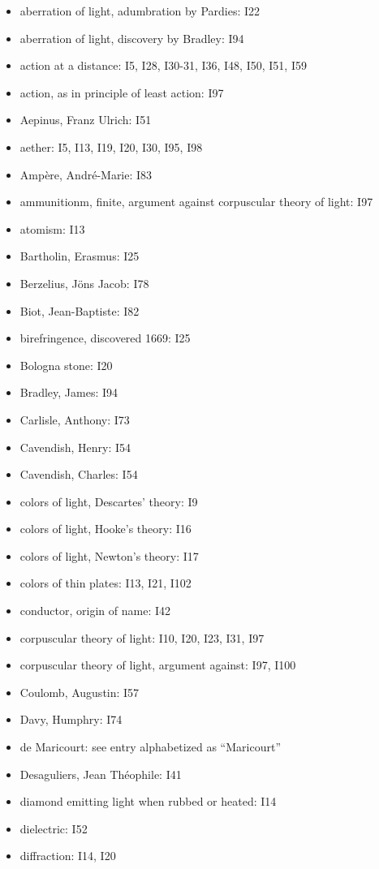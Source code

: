 \documentclass[a4paper]{article}
\theoremstyle{plain}
\theoremstyle{definition}
\begin{document}
\begin{itemize}
\item aberration of light, adumbration by Pardies: I22
\item aberration of light, discovery by Bradley: I94
\item action at a distance: I5, I28, I30-31, I36, I48, I50, I51, I59
\item action, as in principle of least action: I97
\item Aepinus, Franz Ulrich: I51
\item aether: I5, I13, I19, I20, I30, I95, I98
\item Amp\`{e}re, Andr\'{e}-Marie: I83
\item ammunitionm, finite, argument against corpuscular theory of light: I97
\item atomism: I13
\item Bartholin, Erasmus: I25
\item Berzelius, J\"{o}ns Jacob: I78
\item Biot, Jean-Baptiste: I82
\item birefringence, discovered 1669: I25
\item Bologna stone: I20
\item Bradley, James: I94
\item Carlisle, Anthony: I73
\item Cavendish, Henry: I54
\item Cavendish, Charles: I54
\item colors of light, Descartes' theory: I9
\item colors of light, Hooke's theory: I16
\item colors of light, Newton's theory: I17
\item colors of thin plates: I13, I21, I102
\item conductor, origin of name: I42
\item corpuscular theory of light: I10, I20, I23, I31, I97
\item corpuscular theory of light, argument against: I97, I100
\item Coulomb, Augustin: I57
\item Davy, Humphry: I74
\item de Maricourt: see entry alphabetized as ``Maricourt''
\item Desaguliers, Jean Th\'{e}ophile: I41
\item diamond emitting light when rubbed or heated: I14
\item dielectric: I52
\item diffraction: I14, I20

\end{itemize}
\end{document}
